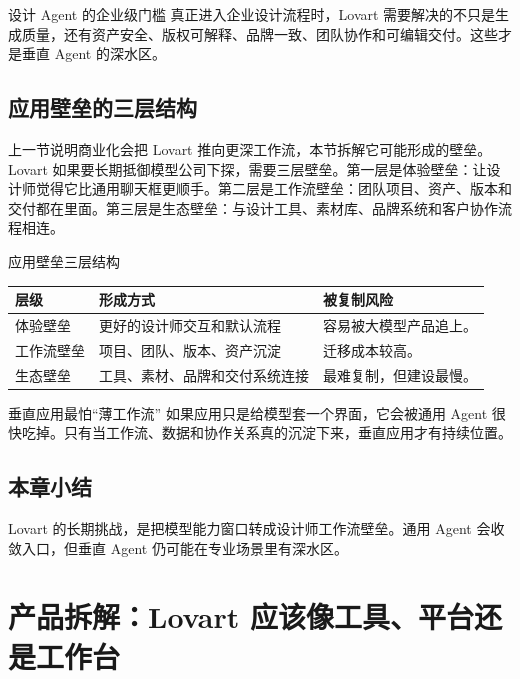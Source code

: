 \documentclass[a4paper]{article}
\begin{document}
\begin{importantbox}{设计 Agent 的企业级门槛}
真正进入企业设计流程时，Lovart 需要解决的不只是生成质量，还有资产安全、版权可解释、品牌一致、团队协作和可编辑交付。这些才是垂直 Agent 的深水区。
\end{importantbox}

\subsection{应用壁垒的三层结构}

上一节说明商业化会把 Lovart 推向更深工作流，本节拆解它可能形成的壁垒。Lovart 如果要长期抵御模型公司下探，需要三层壁垒。第一层是体验壁垒：让设计师觉得它比通用聊天框更顺手。第二层是工作流壁垒：团队项目、资产、版本和交付都在里面。第三层是生态壁垒：与设计工具、素材库、品牌系统和客户协作流程相连。

\begin{knowledgebox}{应用壁垒三层结构}
\begin{tabularx}{\textwidth}{p{}p{}X}
\toprule
层级 & 形成方式 & 被复制风险 \\
\midrule
体验壁垒 & 更好的设计师交互和默认流程 & 容易被大模型产品追上。 \\
工作流壁垒 & 项目、团队、版本、资产沉淀 & 迁移成本较高。 \\
生态壁垒 & 工具、素材、品牌和交付系统连接 & 最难复制，但建设最慢。 \\
\bottomrule
\end{tabularx}
\end{knowledgebox}

\begin{warningbox}{垂直应用最怕“薄工作流”}
如果应用只是给模型套一个界面，它会被通用 Agent 很快吃掉。只有当工作流、数据和协作关系真的沉淀下来，垂直应用才有持续位置。
\end{warningbox}

\subsection{本章小结}

Lovart 的长期挑战，是把模型能力窗口转成设计师工作流壁垒。通用 Agent 会收敛入口，但垂直 Agent 仍可能在专业场景里有深水区。

\section{产品拆解：Lovart 应该像工具、平台还是工作台}
\end{document}
